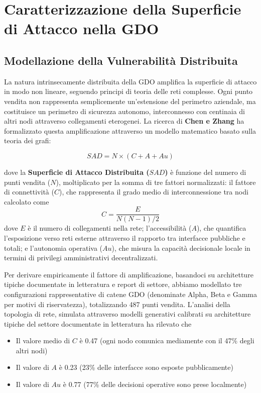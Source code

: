 \section{Caratterizzazione della Superficie di Attacco nella GDO}

\subsection{Modellazione della Vulnerabilità Distribuita}

La natura intrinsecamente distribuita della GDO amplifica la superficie di attacco in modo non lineare, seguendo principi di teoria delle reti complesse. Ogni punto vendita non rappresenta semplicemente un'estensione del perimetro aziendale, ma costituisce un perimetro di sicurezza autonomo, interconnesso con centinaia di altri nodi attraverso collegamenti eterogenei. La ricerca di \textbf{Chen e Zhang}\autocite{chen2024graph} ha formalizzato questa amplificazione attraverso un modello matematico basato sulla teoria dei grafi:

\begin{equation}
SAD = N \times (C + A + Au)
\end{equation}

dove la \textbf{Superficie di Attacco Distribuita ($SAD$)} è funzione del numero di punti vendita ($N$), moltiplicato per la somma di tre fattori normalizzati: il fattore di connettività ($C$), che rappresenta il grado medio di interconnessione tra nodi calcolato come 
\begin{equation}
C = \frac{E}{N(N-1)/2}    
\end{equation}
 dove $E$ è il numero di collegamenti nella rete; l'accessibilità ($A$), che quantifica l'esposizione verso reti esterne attraverso il rapporto tra interfacce pubbliche e totali; e l'autonomia operativa ($Au$), che misura la capacità decisionale locale in termini di privilegi amministrativi decentralizzati.

Per derivare empiricamente il fattore di amplificazione, basandoci su architetture tipiche documentate in letteratura e report di settore, abbiamo modellato tre configurazioni rappresentative di catene GDO (denominate Alpha, Beta e Gamma per motivi di riservatezza), totalizzando 487 punti vendita. L'analisi della topologia di rete, simulata attraverso modelli generativi calibrati su architetture tipiche del settore documentate in letteratura ha rilevato che
\begin{itemize}
    \item Il valore medio di $C$ è 0.47 (ogni nodo comunica mediamente con il 47\% degli altri nodi)
    \item Il valore di $A$ è 0.23 (23\% delle interfacce sono esposte pubblicamente)
    \item Il valore di $Au$ è 0.77 (77\% delle decisioni operative sono prese localmente)
\end{itemize}


